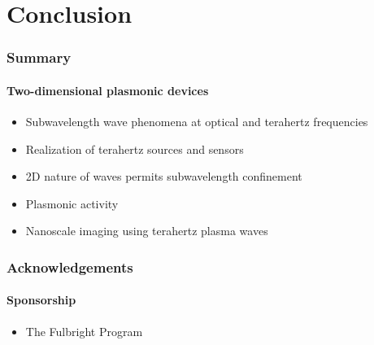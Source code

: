 \documentclass[mathserif,16pt,xcolor=table]{beamer}
\begin{document}
                  \section{Conclusion}
                  \begin{frame}
                    \frametitle{Summary}
                    \framesubtitle{Two-dimensional plasmonic devices}
                    \begin{itemize}
                      \item Subwavelength wave phenomena at optical and terahertz frequencies
                      \item Realization of terahertz sources and sensors
                      \item 2D nature of waves permits subwavelength confinement
                      \item Plasmonic activity
                      \item Nanoscale imaging using terahertz plasma waves
                    \end{itemize}
                  \end{frame}
                  \begin{frame}
                    \frametitle{Acknowledgements}
                    \framesubtitle{Sponsorship}
                    \begin{itemize}
                      \item The Fulbright Program
                    \end{itemize}
                    \begin{figure}
                      \centering
                      \def\svgwidth{.4\linewidth}
                      
                    \end{figure}
                  \end{frame}
\end{document}
